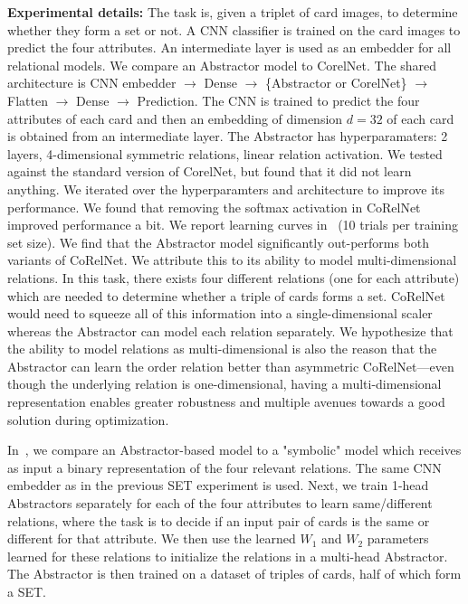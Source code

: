 \textbf{Experimental details:} The task is, given a triplet of card images, to determine whether they form a set or not. A CNN classifier is trained on the card images to predict the four attributes. An intermediate layer is used as an embedder for all relational models. We compare an Abstractor model to CorelNet. The shared architecture is CNN embedder $\to$ Dense $\to$ \{Abstractor or CorelNet\} $\to$ Flatten $\to$ Dense $\to$ Prediction. The CNN is trained to predict the four attributes of
each card and then an embedding of dimension $d=32$ of each card is obtained from an intermediate layer. The Abstractor has hyperparamaters: 2 layers, 4-dimensional symmetric relations, linear relation activation. We tested against the standard version of CorelNet, but found that it did not learn anything. We iterated over the hyperparamters and architecture to improve its performance. We found that removing the softmax activation in CoRelNet improved performance a bit. We report learning curves in~ (10 trials per training set size). We find that the Abstractor model significantly out-performs both variants of CoRelNet. We attribute this to its ability to model multi-dimensional relations. In this task, there exists four different relations (one for each attribute) which are needed to determine whether a triple of cards forms a set. CoRelNet would need to squeeze all of this information into a single-dimensional scaler whereas the Abstractor can model each relation separately. We hypothesize that the ability to model relations as multi-dimensional is also the reason that the Abstractor can learn the order relation better than asymmetric CoRelNet---even though the underlying relation is one-dimensional, having a multi-dimensional representation enables greater robustness and multiple avenues towards a good solution during optimization.


In~, we compare an Abstractor-based model to a "symbolic" model which receives as input a binary representation of the four relevant relations. The same CNN embedder as in the previous SET experiment is used. Next, we train 1-head Abstractors separately for each of the four attributes to learn same/different relations, where the task is to decide if an input pair of cards is the same or different for that attribute. We then use the learned $W_1$ and $W_2$ parameters learned for these relations to initialize the relations in a multi-head Abstractor. The Abstractor is then trained on a dataset of triples of cards, half of which form a SET.

